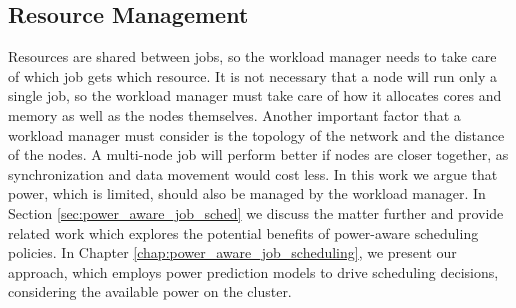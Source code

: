 \subsection{Resource Management} 
Resources are shared between jobs, so the workload manager needs to take care of which job
gets which resource.  It is not necessary that a node will run only a single job, so the
workload manager must take care of how it allocates cores and memory as well as the nodes
themselves.  Another important factor that a workload manager must consider is the
topology of the network and the distance of the nodes.  A multi-node job will perform
better if nodes are closer together, as synchronization and data movement would cost less.
In this work we argue that power, which is limited, should also be managed by the workload
manager.  In Section \ref{sec:power_aware_job_sched} we discuss the matter further and
provide related work which explores the potential benefits of power-aware scheduling
policies.  In Chapter \ref{chap:power_aware_job_scheduling}, we present our approach,
which employs power prediction models to drive scheduling decisions, considering the
available power on the cluster.

